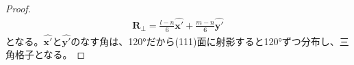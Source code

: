 \documentclass[a4paper,11pt,dvipdfmx]{jsarticle}
\begin{document}
\begin{enumerate}
\begin{itemize}
\begin{proof}
            \begin{align*}
              \boldsymbol{R}_{\perp} = \frac{l - n}{6} \hat{\boldsymbol{x}'} + \frac{m - n }{6} \hat{\boldsymbol{y}'}
            \end{align*}
            となる。$\hat{\boldsymbol{x}'}$と$\hat{\boldsymbol{y}'}$のなす角は、120°だから(111)面に射影すると120°ずつ分布し、三角格子となる。
          \end{proof}
      \end{itemize}
    \end{enumerate}
    
\end{document}
